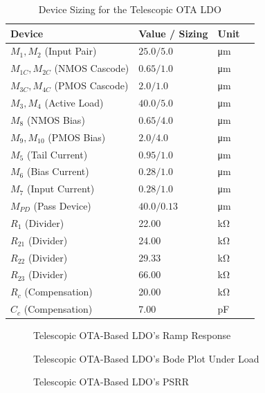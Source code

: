 \documentclass[journal]{IEEEtran}
\newcommand{\svg}[3]{
    \begin{figure}[!h]
        \centering
        
        \caption{#2}
    \end{figure}
}
\begin{document}
\begin{table}[htbp]
    \centering
    \caption{Device Sizing for the Telescopic OTA LDO}
    \label{tab:sizing_tel}
    \begin{tabular}{@{}lllc@{}}
        \toprule
        \textbf{Device} & \textbf{Value / Sizing} & \textbf{Unit} \\
        \midrule
        $M_1, M_2$ (Input Pair) & $25.0 / 5.0$ & \unit{\micro\meter} \\
        $M_{1C}, M_{2C}$ (NMOS Cascode) & $0.65 / 1.0$ & \unit{\micro\meter} \\
        $M_{3C}, M_{4C}$ (PMOS Cascode) & $2.0 / 1.0$ & \unit{\micro\meter} \\
        $M_3, M_4$ (Active Load) & $40.0 / 5.0$ & \unit{\micro\meter} \\
        \midrule
        $M_8$ (NMOS Bias) & $0.65 / 4.0$ & \unit{\micro\meter} \\
        $M_9, M_{10}$ (PMOS Bias) & $2.0 / 4.0$ & \unit{\micro\meter} \\
        $M_5$ (Tail Current) & $0.95 / 1.0$ & \unit{\micro\meter} \\
        $M_6$ (Bias Current) & $0.28 / 1.0$ & \unit{\micro\meter} \\
        $M_7$ (Input Current) & $0.28 / 1.0$ & \unit{\micro\meter} \\
        \midrule
        $M_{PD}$ (Pass Device) & $40.0 / 0.13$ & \unit{\micro\meter} \\
        \midrule
        $R_1$ (Divider) & 22.00 & \unit{\kilo\ohm} \\
        $R_{21}$ (Divider) & 24.00 & \unit{\kilo\ohm} \\
        $R_{22}$ (Divider) & 29.33 & \unit{\kilo\ohm} \\
        $R_{23}$ (Divider) & 66.00 & \unit{\kilo\ohm} \\
        $R_c$ (Compensation) & 20.00 & \unit{\kilo\ohm} \\
        $C_c$ (Compensation) & 7.00 & \unit{\pico\farad} \\
        \bottomrule
    \end{tabular}
\end{table}

\svg{../simulations/images/tel_tran.svg}{Telescopic OTA-Based LDO's Ramp Response}{1}

\svg{../simulations/images/tel_bode.svg}{Telescopic OTA-Based LDO's Bode Plot Under Load}{1}

\svg{../simulations/images/tel_psrr.svg}{Telescopic OTA-Based LDO's PSRR}{0.9}
\end{document}
